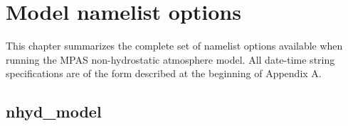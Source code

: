 
\chapter{Model namelist options}

This chapter summarizes the complete set of namelist options available when running the MPAS non-hydrostatic atmosphere model.
All date-time string specifications are of the form described at the beginning of Appendix A.

\section{nhyd\_model}

